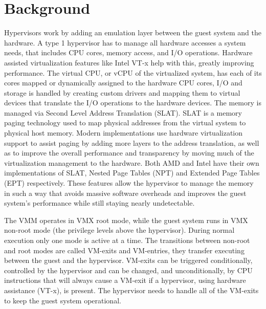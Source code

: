 \section{Background}\label{s:background}



Hypervisors work by adding an emulation layer between the guest system and the hardware. A type 1 hypervisor has to manage all hardware accesses a system needs, 
that includes CPU cores, memory access, and I/O operations. Hardware assisted virtualization features like Intel VT-x help with this, greatly improving performance. 
The virtual CPU, or vCPU of the virtualized system, has each of its cores mapped or dynamically assigned to the hardware CPU cores, 
I/O and storage is handled by creating custom drivers and mapping them to virtual devices that translate the I/O operations to the hardware devices. 
The memory is managed via Second Level Address Translation (SLAT). SLAT is a memory paging technology used to map physical addresses from the virtual system to physical host memory. 
Modern implementations use hardware virtualization support to assist paging by adding more layers to the address translation, as well as 
to improve the overall performance and transparency by moving much of the virtualization management to the hardware. 
Both AMD and Intel have their own implementations of SLAT, Nested Page Tables (NPT) and Extended Page Tables (EPT) respectively.
These features allow the hypervisor to manage the memory in such a way that avoids massive software overheads and improves the guest system's performance 
while still staying nearly undetectable. 

The VMM operates in VMX root mode, while the guest system runs in VMX non-root mode (the privilege levels above the hypervisor). During normal execution only one mode is active at a time. 
The transitions between non-root and root modes are called VM-exits and VM-entries, they transfer executing between the guest and the hypervisor. 
VM-exits can be triggered conditionally, controlled by the hypervisor and can be changed, and unconditionally, by CPU instructions that will always cause a VM-exit if a hypervisor, using hardware assistance (VT-x), is present. 
The hypervisor needs to handle all of the VM-exits to keep the guest system operational.


